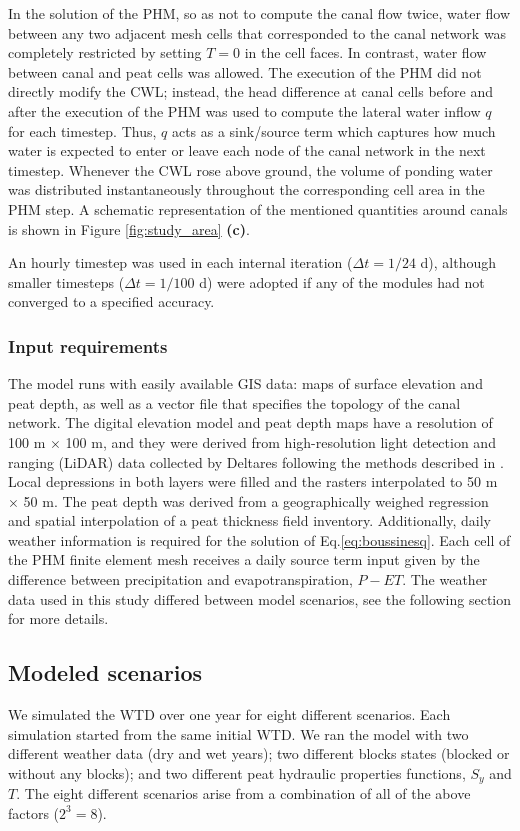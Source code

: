 \documentclass[bg, manuscript]{copernicus}
\begin{document}
In the solution of the PHM, so as not to compute the canal flow twice, water flow between any two adjacent mesh cells that corresponded to the canal network was completely restricted by setting $T=0$ in the cell faces.
In contrast, water flow between canal and peat cells was allowed. 
The execution of the PHM did not directly modify the CWL; instead, the head difference at canal cells before and after the execution of the PHM was used to compute the lateral water inflow $q$ for each timestep.
Thus, $q$ acts as a sink/source term which captures how much water is expected to enter or leave each node of the canal network in the next timestep.
Whenever the CWL rose above ground, the volume of ponding water was distributed instantaneously throughout the corresponding cell area in the PHM step.
A schematic representation of the mentioned quantities around canals is shown in Figure \ref{fig:study_area} \textbf{(c)}.

An hourly timestep was used in each internal iteration ($\Delta t = 1/24$ \unit{d}), although smaller timesteps ($\Delta t = 1/100$ \unit{d}) were adopted if any of the modules had not converged to a specified accuracy.

\subsubsection{Input requirements}
The model runs with easily available GIS data: maps of surface elevation and peat depth, as well as a vector file that specifies the topology of the canal network.
The digital elevation model and peat depth maps have a resolution of 100 \unit{m} $\times$ 100 \unit{m}, and they were derived from high-resolution light detection and ranging (LiDAR) data collected by Deltares following the methods described in \cite{vernimmenMappingDeepPeat2020}. 
Local depressions in both layers were filled and the rasters interpolated to 50 \unit{m} $\times$ 50 \unit{m}.
The peat depth was derived from a geographically weighed regression and spatial interpolation of a peat thickness field inventory.
Additionally, daily weather information is required for the solution of Eq.\eqref{eq:boussinesq}.
Each cell of the PHM finite element mesh receives a daily source term input given by  the difference between precipitation and evapotranspiration, $P -ET$.
The weather data used in this study differed between model scenarios, see the following section for more details.

\subsection{Modeled scenarios}
We simulated the WTD over one year for eight different scenarios.
Each simulation started from the same initial WTD.
We ran the model with two different weather data (dry and wet years); two different blocks states (blocked or without any blocks); and two different peat hydraulic properties functions, $S_y$ and $T$.
The eight different scenarios arise from a combination of all of the above factors ($2^3 = 8$).
\end{document}
